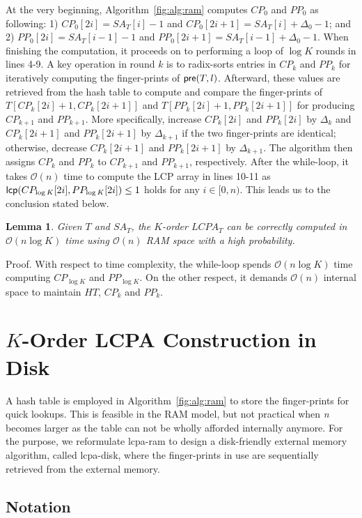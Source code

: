 \documentclass[article]{IEEEtran}
\newtheorem{lem}[thm]{Lemma}
\theoremstyle{definition}
\theoremstyle{remark}
\numberwithin{equation}{section}
\begin{document}
At the very beginning, Algorithm~\ref{fig:alg:ram} computes $CP_0$ and $PP_0$ as following: 1) $CP_0[2i]=SA_T[i]-1$ and $CP_0[2i+1]=SA_T[i]+ \Delta_0 - 1$; and 2) $PP_0[2i]=SA_T[i-1]-1$ and $PP_0[2i+1]=SA_T[i-1]+ \Delta_0 - 1$. When finishing the computation, it proceeds on to performing a loop of $\log K$ rounds in lines 4-9. A key operation in round $k$ is to radix-sorts entries in $CP_k$ and $PP_k$ for iteratively computing the finger-prints of ${\sf pre}(T,l)$. Afterward, these values are retrieved from the hash table to compute and compare the finger-prints of $T[CP_k[2i]+1,CP_k[2i+1]]$ and $T  [PP_k[2i]+1,PP_k[2i+1]]$ for producing $CP_{k+1}$ and $PP_{k+1}$. More specifically, increase $CP_{k}[2i]$ and $PP_{k}[2i]$ by $\Delta_k$ and $CP_{k}[2i+1]$ and $PP_{k}[2i+1]$ by $\Delta_{k+1}$ if the two finger-prints are identical; otherwise, decrease $CP_{k}[2i+1]$ and $PP_{k}[2i+1]$  by $\Delta_{k+1}$. The algorithm then assigns $CP_k$ and $PP_k$ to $CP_{k+1}$ and $PP_{k+1}$, respectively. After the while-loop, it takes $\mathcal{O}(n)$ time to compute the LCP array in lines 10-11 as ${\sf lcp}(CP_{\log K}[2i],PP_{\log K}[2i]) \le 1$ holds for any $i \in [0,n)$. This leads us to the conclusion stated below.

\begin{lem}
\label{thm:lcp:ram}
Given $T$ and $SA_T$, the $K$-order $LCPA_T$ can be correctly computed in $\mathcal{O}(n\log K)$ time using $\mathcal{O}(n)$ RAM space with a high probability.
\end{lem}
Proof. With respect to time complexity, the while-loop spends $\mathcal{O}(n\log K)$ time computing $CP_{\log K}$ and $PP_{\log K}$. On the other respect, it demands $\mathcal{O}(n)$ internal space to maintain $HT$, $CP_k$ and $PP_k$.

\section{$K$-Order LCPA Construction in Disk}\label{sec:construction_in_em}

A hash table is employed in Algorithm~\ref{fig:alg:ram} to store the finger-prints for quick lookups. This is feasible in the RAM model, but not practical when {\em n} becomes larger as the table can not be wholly afforded internally anymore. For the purpose, we reformulate lcpa-ram to design a disk-friendly external memory algorithm, called lcpa-disk, where the finger-prints in use are sequentially retrieved from the external memory.

\subsection{Notation}
\end{document}
